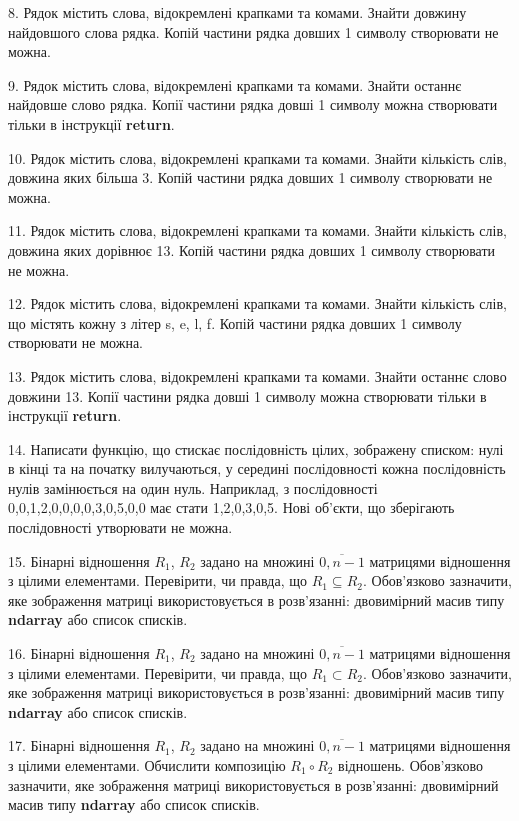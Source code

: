 \documentclass[10pt, ukrainian]{article}
\begin{document}
{\begin {Large}
8. Рядок містить слова, відокремлені крапками та комами. Знайти довжину найдовшого слова рядка. Копій частини рядка довших 1 символу створювати не можна.

9. Рядок містить слова, відокремлені крапками та комами. Знайти останнє найдовше слово рядка. Копії частини рядка довші 1 символу можна створювати тільки в інструкції \textbf{return}.

10. Рядок містить слова, відокремлені крапками та комами. Знайти кількість слів, довжина яких більша 3. Копій частини рядка довших 1 символу створювати не можна.

11. Рядок містить слова, відокремлені крапками та комами. Знайти кількість слів, довжина яких дорівнює 13. Копій частини рядка довших 1 символу створювати не можна.

12. Рядок містить слова, відокремлені крапками та комами. Знайти кількість слів, що містять кожну з літер s, e, l, f. Копій частини рядка довших 1 символу створювати не можна.

13. Рядок містить слова, відокремлені крапками та комами. Знайти останнє слово довжини 13. Копії частини рядка довші 1 символу можна створювати тільки в інструкції \textbf{return}.

14. Написати функцію, що стискає послідовність цілих, зображену списком: нулі в кінці та на початку вилучаються, у середині послідовності кожна послідовність нулів замінюється на один нуль. Наприклад, з послідовності 0,0,1,2,0,0,0,0,3,0,5,0,0 має стати 1,2,0,3,0,5. Нові об'єкти, що зберігають послідовності утворювати не можна.

15. Бінарні відношення $R_1$, $R_2$ задано на множині $\overline{0,n-1}$ матрицями відношення з цілими елементами. Перевірити, чи правда, що  $R_1\subseteq R_2$. Обов'язково зазначити, яке зображення матриці використовується в розв'язанні: двовимірний масив типу \textbf{ndarray} або список списків.

\newpage

16. Бінарні відношення $R_1$, $R_2$ задано на множині $\overline{0,n-1}$ матрицями відношення з цілими елементами. Перевірити, чи правда, що $R_1\subset R_2$. Обов'язково зазначити, яке зображення матриці використовується в розв'язанні: двовимірний масив типу \textbf{ndarray} або список списків.

17. Бінарні відношення $R_1$, $R_2$ задано на множині $\overline{0,n-1}$ матрицями відношення з цілими елементами. Обчислити композицію $R_1\circ R_2$ відношень. Обов'язково зазначити, яке зображення матриці використовується в розв'язанні: двовимірний масив типу \textbf{ndarray} або список списків.


\end{Large}}
\end{document}
